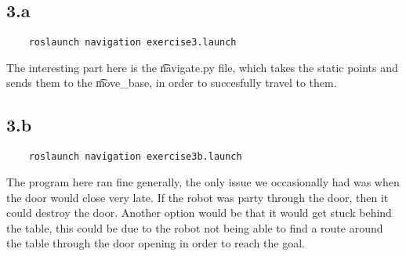 

\subsection*{3.a}
\begin{lstlisting}
	roslaunch navigation exercise3.launch
\end{lstlisting}

The interesting part here is the \t{navigate.py} file, which takes the static points and sends them to the \t{move_base}, in order to succesfully travel to them.


\subsection*{3.b}
\begin{lstlisting}
	roslaunch navigation exercise3b.launch
\end{lstlisting}

The program here ran fine generally, the only issue we occasionally had was when the door would close very late. If the robot was party through the door, then it could destroy the door. Another option would be that it would get stuck behind the table, this could be due to the robot not being able to find a route around the table through the door opening in order to reach the goal.
